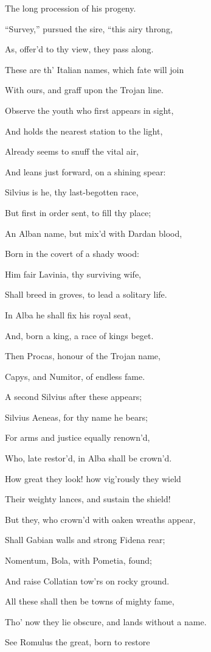 The long procession of his progeny.

“Survey,” pursued the sire, “this airy throng,

As, offer’d to thy view, they pass along.

These are th’ Italian names, which fate will join

With ours, and graff upon the Trojan line.

Observe the youth who first appears in sight,

And holds the nearest station to the light,

Already seems to snuff the vital air,

And leans just forward, on a shining spear:

Silvius is he, thy last-begotten race,

But first in order sent, to fill thy place;

An Alban name, but mix’d with Dardan blood,

Born in the covert of a shady wood:

Him fair Lavinia, thy surviving wife,

Shall breed in groves, to lead a solitary life.

In Alba he shall fix his royal seat,

And, born a king, a race of kings beget.

Then Procas, honour of the Trojan name,

Capys, and Numitor, of endless fame.

A second Silvius after these appears;

Silvius Aeneas, for thy name he bears;

For arms and justice equally renown’d,

Who, late restor’d, in Alba shall be crown’d.

How great they look! how vig’rously they wield

Their weighty lances, and sustain the shield!

But they, who crown’d with oaken wreaths appear,

Shall Gabian walls and strong Fidena rear;

Nomentum, Bola, with Pometia, found;

And raise Collatian tow’rs on rocky ground.

All these shall then be towns of mighty fame,

Tho’ now they lie obscure, and lands without a name.

See Romulus the great, born to restore

